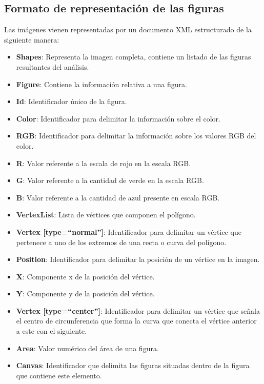 \subsection{Formato de representación de las figuras}

Las imágenes vienen representadas por un documento XML  estructurado de la siguiente manera:

\begin{itemize}
\item \textbf{Shapes}: Representa la imagen completa, contiene un listado de las figuras resultantes del análisis.
\item \textbf{Figure}: Contiene la información relativa a una figura.
\item \textbf{Id}: Identificador único de la figura.
\item \textbf{Color}: Identificador para delimitar la información sobre el color.
\item \textbf {RGB}: Identificador para delimitar la información sobre los valores RGB del color.
\item \textbf{R}: Valor referente a la escala de rojo en la escala RGB.
\item \textbf{G}: Valor referente a la cantidad de verde en la escala RGB.
\item \textbf{B}: Valor referente a la cantidad de azul presente en escala RGB.
\item \textbf{VertexList}: Lista de vértices que componen el polígono.
\item \textbf{Vertex [type=``normal'']}: Identificador para delimitar un vértice que pertenece a uno de los extremos de una recta o curva del polígono.
\item \textbf{Position}: Identificador para delimitar la posición de un vértice en la imagen.
\item \textbf{X}: Componente x de la posición del vértice.
\item \textbf{Y}: Componente y de la posición del vértice.
\item \textbf{Vertex [type=``center'']}: Identificador para delimitar un vértice que señala el centro de circunferencia que forma la curva que conecta el vértice anterior a este con el siguiente.
\item \textbf{Area}: Valor numérico del área de una figura.
\item \textbf{Canvas}: Identificador que delimita las figuras situadas dentro de la figura que contiene este elemento. 
\end{itemize}

